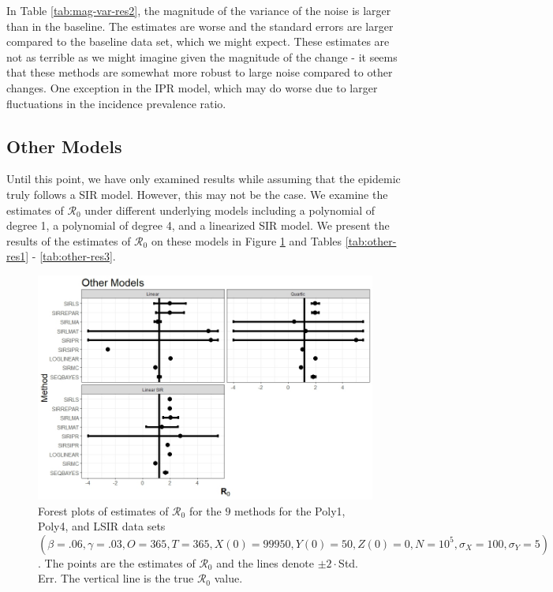 \documentclass[12pt]{article}
\newcommand{\xxsir}{\ensuremath{9} } %
\newcommand{\rr}{\ensuremath{\mathcal{R}_0}}
\begin{document}
In Table \ref{tab:mag-var-res2}, the magnitude of the variance of the noise is larger than in the baseline. The estimates are worse and the standard errors are larger compared to the baseline data set, which we might expect. These estimates are not as terrible as we might imagine given the magnitude of the change - it seems that these methods are somewhat more robust to large noise compared to other changes. One exception in the IPR model, which may do worse due to larger fluctuations in the incidence prevalence ratio. 

\subsection{Other Models}\label{sec:res-oth}
Until this point, we have only examined results while assuming that the epidemic truly follows a SIR model.  However, this may not be the case.  We examine the estimates of $\rr$ under different underlying models including a polynomial of degree 1, a polynomial of degree 4, and a linearized SIR model.  We present the results of the estimates of $\rr$ on these models in Figure \ref{fig:other-res} and Tables \ref{tab:other-res1} - \ref{tab:other-res3}.



\begin{figure}[H]
  \begin{center}
    \includegraphics[scale=0.5]{images/other.jpeg}
  \caption{Forest plots of estimates of $\rr$ for the \xxsir methods for the Poly1, Poly4, and LSIR data sets $(\beta=.06, \gamma=.03, O=365, T=365, X(0)=99950, Y(0)=50, Z(0)=0, N=10^5, \sigma_X=100, \sigma_Y=5)$.  The points are the estimates of $\rr$ and the lines denote $\pm 2\cdot $Std. Err.  The vertical line is the true $\rr$ value.}
  \label{fig:other-res}	
  \end{center}
\end{figure}
\end{document}
